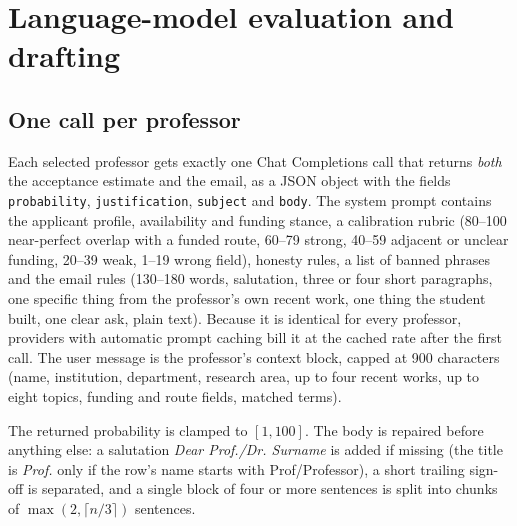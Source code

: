 \documentclass[11pt,a4paper]{article}
\newcommand{\code}[1]{\texttt{#1}}
\begin{document}
\section{Language-model evaluation and drafting}

\subsection{One call per professor}
Each selected professor gets exactly one Chat Completions call that returns \emph{both} the
acceptance estimate and the email, as a JSON object with the fields \code{probability},
\code{justification}, \code{subject} and \code{body}. The system prompt contains the applicant
profile, availability and funding stance, a calibration rubric (80--100 near-perfect overlap with
a funded route, 60--79 strong, 40--59 adjacent or unclear funding, 20--39 weak, 1--19 wrong
field), honesty rules, a list of banned phrases and the email rules (130--180 words, salutation,
three or four short paragraphs, one specific thing from the professor's own recent work, one
thing the student built, one clear ask, plain text). Because it is identical for every
professor, providers with automatic prompt caching bill it at the cached rate after the first
call. The user message is the professor's context block, capped at 900 characters (name,
institution, department, research area, up to four recent works, up to eight topics, funding
and route fields, matched terms).

The returned probability is clamped to $[1, 100]$. The body is repaired before anything else:
a salutation \emph{Dear Prof./Dr. Surname} is added if missing (the title is \emph{Prof.} only if
the row's name starts with Prof/Professor), a short trailing sign-off is separated, and a
single block of four or more sentences is split into chunks of
$\max(2, \lceil n/3 \rceil)$ sentences.
\end{document}
